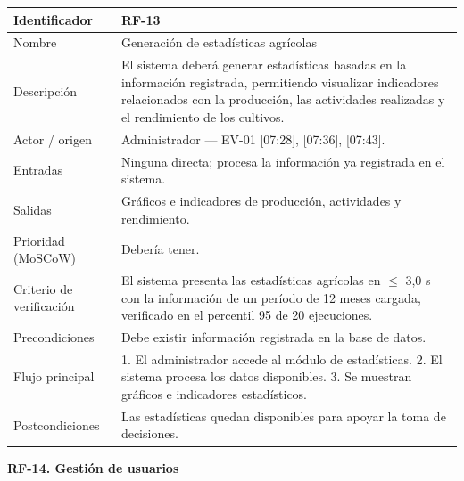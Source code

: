 \documentclass[12pt,a4paper]{article}
\begin{document}
\begin{center}
\begin{longtable}{|p{3.5cm}|p{10.7cm}|}
\hline
Identificador & RF-13 \\
\hline
Nombre & Generación de estadísticas agrícolas \\
\hline
Descripción & El sistema deberá generar estadísticas basadas en la información registrada, permitiendo visualizar indicadores relacionados con la producción, las actividades realizadas y el rendimiento de los cultivos. \\
\hline
Actor / origen & Administrador --- EV-01 [07:28], [07:36], [07:43]. \\
\hline
Entradas & Ninguna directa; procesa la información ya registrada en el sistema. \\
\hline
Salidas & Gráficos e indicadores de producción, actividades y rendimiento. \\
\hline
Prioridad (MoSCoW) & Debería tener. \\
\hline
Criterio de verificación & El sistema presenta las estadísticas agrícolas en $\leq$ 3,0 s con la información de un período de 12 meses cargada, verificado en el percentil 95 de 20 ejecuciones. \\
\hline
Precondiciones & Debe existir información registrada en la base de datos. \\
\hline
Flujo principal & 1. El administrador accede al módulo de estadísticas. 2. El sistema procesa los datos disponibles. 3. Se muestran gráficos e indicadores estadísticos. \\
\hline
Postcondiciones & Las estadísticas quedan disponibles para apoyar la toma de decisiones. \\
\hline
\end{longtable}
\end{center}

\bigskip
\noindent\textbf{RF-14. Gestión de usuarios}
\label{tab:RF-14}
\end{document}
